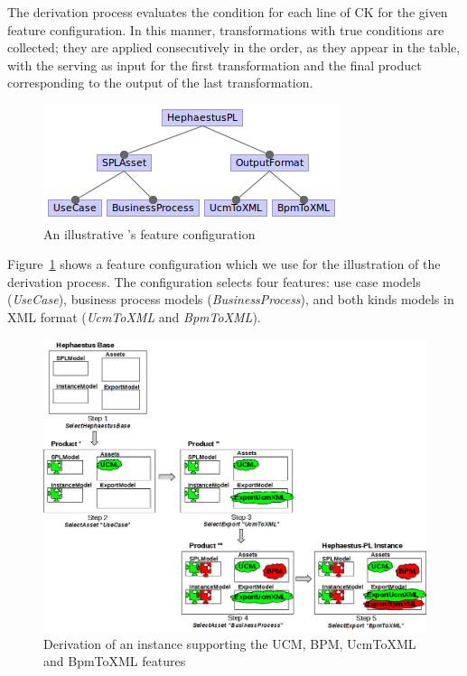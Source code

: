 
The derivation process evaluates the condition for each line of CK for the given feature configuration. 
In this manner, transformations with true conditions are collected; they are applied consecutively in the order, as they appear in the table, with the \emptyi{} serving as input for the first transformation and the final product corresponding to the output of the last transformation. 


\begin{figure}[t!]
\begin{center}
\includegraphics[scale=0.8]{imagens/fc-ucm-bpm.png}
\end{center}
\caption{An illustrative \hpl's feature configuration}
\label{fig:fc-ucm-bpm}
\end{figure}


Figure~\ref{fig:fc-ucm-bpm} shows a feature configuration which we use for the illustration of the derivation process. The configuration selects four features: use case models (\emph{UseCase}), business process models (\emph{BusinessProcess}), and both kinds models in XML format (\emph{UcmToXML} and \emph{BpmToXML}).


\begin{figure}[t!]
\begin{center}
\includegraphics[width=\textwidth]{imagens/derivation.png}
\end{center}
\caption{Derivation of an \hpl{} instance supporting the UCM, BPM, UcmToXML and BpmToXML features}
\label{fig:hpl-derivation}
\end{figure}

